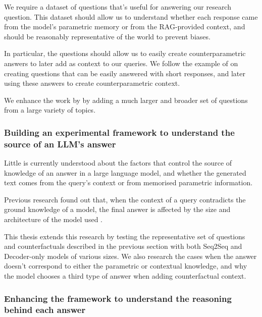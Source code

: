 We require a dataset of questions that's useful for answering our research question.
This dataset should allow us to understand whether each response came from the model's parametric memory or from the RAG-provided context, and should be reasonably representative of the world to prevent biases.

In particular, the questions should allow us to easily create counterparametric answers to later add as context to our queries.
We follow the example of \citeauthor{factual_recall} on creating questions that can be easily answered with short responses, and later using these answers to create counterparametric context.

We enhance the work by \citeauthor{factual_recall} by adding a much larger and broader set of questions from a large variety of topics.

\subsubsection{Building an experimental framework to understand the source of an LLM's answer}
\label{intro_models_numbers}

Little is currently understood about the factors that control the source of knowledge of an answer in a large language model, and whether the generated text comes from the query's context or from memorised parametric information.

Previous research found out that, when the context of a query contradicts the ground knowledge of a model, the final answer is affected by the size and architecture of the model used \citep{factual_recall}.

This thesis extends this research by testing the representative set of questions and counterfactuals described in the previous section with both Seq2Seq and Decoder-only models of various sizes.
We also research the cases when the answer doesn't correspond to either the parametric or contextual knowledge, and why the model chooses a third type of answer when adding counterfactual context.


\subsubsection{Enhancing the framework to understand the reasoning behind each answer}

